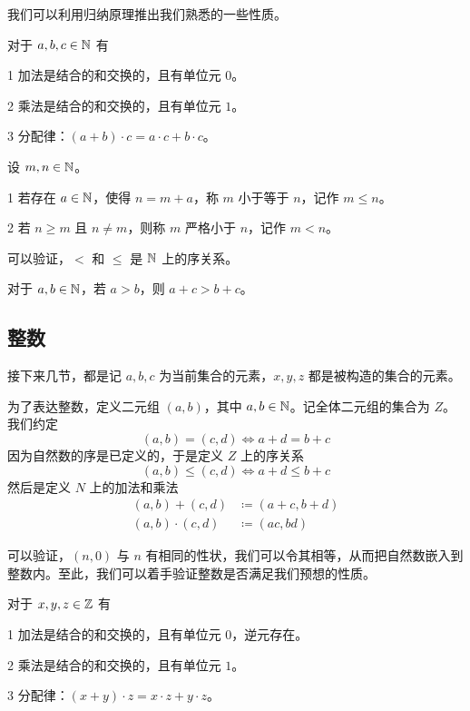 我们可以利用归纳原理推出我们熟悉的一些性质。

\begin{theorem}[$\NN$ 的代数算律]
	对于 $a,b,c\in \mathbb{N}$ 有

	\num{1} 加法是结合的和交换的，且有单位元 $0$。

	\num{2} 乘法是结合的和交换的，且有单位元 $1$。

	\num{3} 分配律：$(a+b) \cdot  c = a \cdot c + b\cdot c$。
\end{theorem}

\begin{definition}[$\NN$ 的序]
	设 $m,n\in \mathbb{N}$。

	\num{1} 若存在 $a\in \mathbb{N}$，使得 $n=m+a$，称 $m$ 小于等于 $n$，记作 $m \leqslant n$。

	\num{2} 若 $n\geqslant m$ 且 $n\ne m$，则称 $m$ 严格小于 $n$，记作 $m < n$。
\end{definition}

可以验证，$<$ 和 $\leqslant$ 是 $\NN$ 上的序关系。

\begin{theorem}[加法保序]
	对于 $a,b\in \mathbb{N}$，若 $a>b$，则 $a+c>b+c$。
\end{theorem}

\subsection{整数}

接下来几节，都是记 $a,b,c$ 为当前集合的元素，$x,y,z$ 都是被构造的集合的元素。

为了表达整数，定义二元组 $(a,b)$，其中 $a,b \in \mathbb{N}$。记全体二元组的集合为 $Z$。我们约定
$$(a,b) = (c,d) \Leftrightarrow a+d=b+c$$
因为自然数的序是已定义的，于是定义 $Z$ 上的序关系
$$(a,b) \leqslant (c,d) \Leftrightarrow a+d \leqslant b+c$$
然后是定义 $N$ 上的加法和乘法
\begin{equation*}
	\begin{aligned}
		(a,b) + (c,d) &\coloneqq  (a+c,b+d)\\
		(a,b) \cdot (c,d) &\coloneqq  (a c,b d)
	\end{aligned}
\end{equation*}

可以验证，$(n,0)$ 与 $n$ 有相同的性状，我们可以令其相等，从而把自然数嵌入到整数内。至此，我们可以着手验证整数是否满足我们预想的性质。

\begin{theorem}[$\ZZ$ 的代数算律]
	对于 $x,y,z\in \mathbb{Z}$ 有

	\num{1} 加法是结合的和交换的，且有单位元 $0$，逆元存在。

	\num{2} 乘法是结合的和交换的，且有单位元 $1$。

	\num{3} 分配律：$(x+y) \cdot  z = x \cdot z + y\cdot z$。
\end{theorem}

